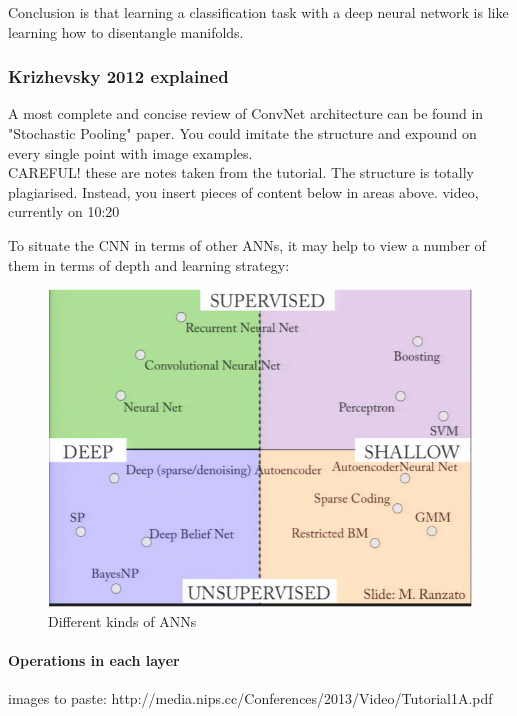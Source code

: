 \documentclass[a4paper,11pt]{article}
\begin{document}
Conclusion is that learning a classification task with a deep neural network is like learning how to disentangle manifolds. 


\subsubsection{Krizhevsky 2012 explained}

A most complete and concise review of ConvNet architecture can be found in "Stochastic Pooling" paper. You could imitate the structure and expound on every single point with image examples. \\

CAREFUL! these are notes taken from the tutorial\cite{nips-tut}. The structure is totally plagiarised. Instead, you insert pieces of content below in areas above.
video, currently on 10:20

To situate the CNN in terms of other ANNs, it may help to view a number of them in terms of depth and learning strategy:

\begin{figure}[h!]
	\centering
	\includegraphics[scale=0.6]{images/all_neural_networks.png}
	\caption{Different kinds of ANNs}
\end{figure}


\paragraph{Operations in each layer}

images to paste: http://media.nips.cc/Conferences/2013/Video/Tutorial1A.pdf 
\end{document}
